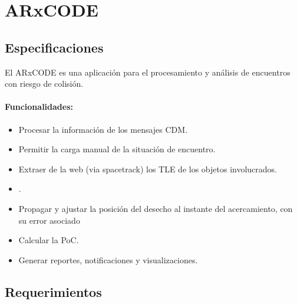 \chapter{ARxCODE}
\label{chap:arxcode} 

\section{Especificaciones}
El ARxCODE es una aplicaci\'on para el procesamiento y an\'alisis de encuentros con riesgo de colisi\'on.\\

\subsubsection*{Funcionalidades:}
\begin{itemize}
\item Procesar la informaci\'on de los mensajes CDM.\\
\item Permitir la carga manual de la situaci\'on de encuentro.\\
\item Extraer de la web (via spacetrack) los TLE de los objetos involucrados.\\
\item .\\
\item Propagar y ajustar la posici\'on del desecho al instante del acercamiento, con su error asociado\\
\item Calcular la PoC.\\
\item Generar reportes, notificaciones y visualizaciones.\\
\end{itemize}

\section{Requerimientos}

